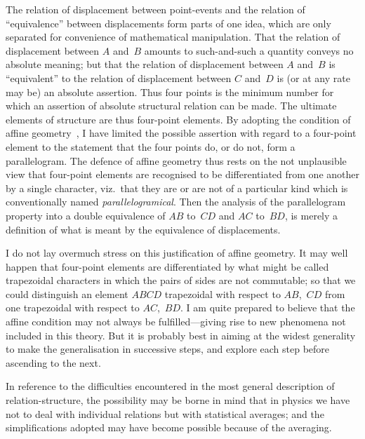 \documentclass[12pt]{book}
\begin{document}
The relation of displacement between point\hyp{}events and the relation of
%
``equivalence'' between displacements form parts of one idea, which are only
separated for convenience of mathematical manipulation. That the relation of
displacement between $A$ and~$B$ amounts to such\hyp{}and\hyp{}such a quantity conveys
no absolute meaning; but that the relation of displacement between $A$ and~$B$
is ``equivalent'' to the relation of displacement between $C$ and~$D$ is (or at
any rate may be) an absolute assertion. Thus four points is the minimum
number for which an assertion of absolute structural relation can be made.
The ultimate elements of structure are thus four-point elements. By adopting
the condition of affine geometry~, I have limited the possible assertion
with regard to a four-point element to the statement that the four points do,
or do not, form a parallelogram. The defence of affine geometry thus rests on
the not unplausible view that four-point elements are recognised to be differentiated
from one another by a single character, viz.\ that they are or are not
of a particular kind which is conventionally named \emph{parallelogramical}. Then
%
the analysis of the parallelogram property into a double equivalence of $AB$ to~$CD$
and $AC$ to~$BD$, is merely a definition of what is meant by the equivalence
of displacements.

I do not lay overmuch stress on this justification of affine geometry. It
may well happen that four-point elements are differentiated by what might
be called trapezoidal characters in which the pairs of sides are not commutable;
so that we could distinguish an element $ABCD$ trapezoidal with respect to
$AB$,~$CD$ from one trapezoidal with respect to $AC$,~$BD$. I am quite prepared
to believe that the affine condition may not always be fulfilled---giving rise to
new phenomena not included in this theory. But it is probably best in aiming
at the widest generality to make the generalisation in successive steps, and
explore each step before ascending to the next.

In reference to the difficulties encountered in the most general description
of relation\hyp{}structure, the possibility may be borne in mind that in physics we
have not to deal with individual relations but with statistical averages; and
the simplifications adopted may have become possible because of the averaging.

%
\end{document}
